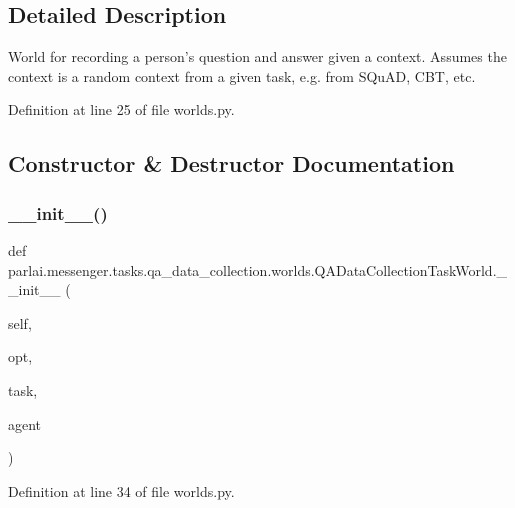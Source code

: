 \subsection{Detailed Description}
\begin{DoxyVerb}World for recording a person's question and answer given a context.
Assumes the context is a random context from a given task, e.g.
from SQuAD, CBT, etc.
\end{DoxyVerb}
 

Definition at line 25 of file worlds.\+py.



\subsection{Constructor \& Destructor Documentation}
\mbox{\label{classparlai_1_1messenger_1_1tasks_1_1qa__data__collection_1_1worlds_1_1QADataCollectionTaskWorld_a83f5c2c5baa659af1426922438190f99}} 
\subsubsection{\texorpdfstring{\+\_\+\+\_\+init\+\_\+\+\_\+()}{\_\_init\_\_()}}
{\footnotesize\ttfamily def parlai.\+messenger.\+tasks.\+qa\+\_\+data\+\_\+collection.\+worlds.\+Q\+A\+Data\+Collection\+Task\+World.\+\_\+\+\_\+init\+\_\+\+\_\+ (\begin{DoxyParamCaption}\item[{}]{self,  }\item[{}]{opt,  }\item[{}]{task,  }\item[{}]{agent }\end{DoxyParamCaption})}



Definition at line 34 of file worlds.\+py.



